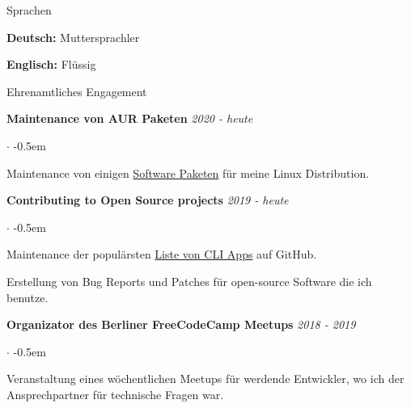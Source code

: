 \documentclass{cv}
\begin{document}
\begin{rSection}{Sprachen}
  \begin{minipage}[l]{0.48\linewidth}
    {\bf Deutsch:} Muttersprachler
  \end{minipage}
  \begin{minipage}[l]{0.48\linewidth}
    {\bf Englisch:} Flüssig \hfill
  \end{minipage}
\end{rSection}

\begin{rSection}{Ehrenamtliches Engagement}

  \hfil  {\bf Maintenance von AUR Paketen}
  \hfill
  {\em 2020 - heute}

  \begin{list}{$\cdot$}{}
  \itemsep -0.5em \vspace{-0.5em}
    \smallskip
  \item Maintenance von einigen \href{https://aur.archlinux.org/packages/?SeB=m&K=jneidel}{Software Paketen} für meine Linux Distribution.
  \end{list}

  {\bf Contributing to Open Source projects}
  \hfill
  {\em 2019 - heute}

  \begin{list}{$\cdot$}{}
  \itemsep -0.5em \vspace{-0.5em}
    \smallskip
  \item Maintenance der populärsten \href{https://github.com/agarrharr/awesome-cli-apps}{Liste von CLI Apps} auf GitHub.
  \item Erstellung von Bug Reports und Patches für open-source Software die ich benutze.
  \end{list}

  {\bf Organizator des Berliner FreeCodeCamp Meetups}
  \hfill
  {\em 2018 - 2019}

  \begin{list}{$\cdot$}{}
  \itemsep -0.5em \vspace{-0.5em}
    \smallskip
  \item Veranstaltung eines wöchentlichen Meetups für werdende Entwickler, wo ich der Ansprechpartner für technische Fragen war.
  \end{list}

\end{rSection}
\end{document}
